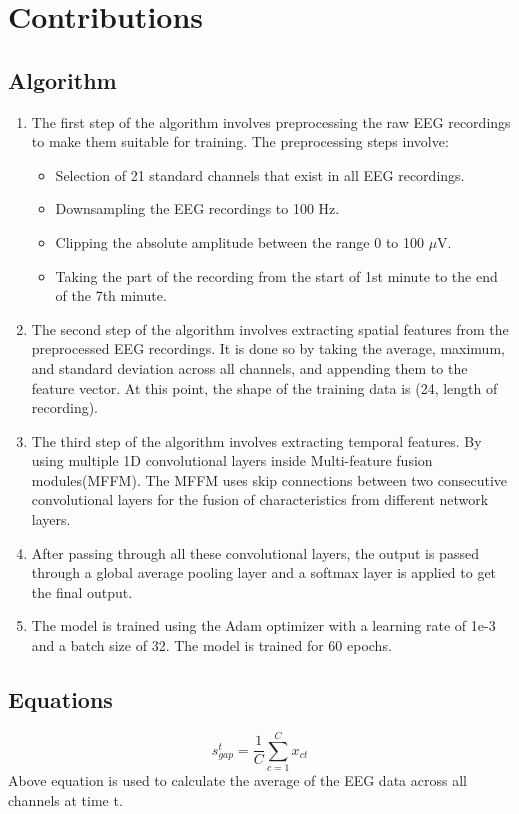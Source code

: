 \documentclass[10pt]{article}
\begin{document}
\section{Contributions} 
\subsection{Algorithm} 
\begin{enumerate}
  \item The first step of the algorithm involves preprocessing the raw EEG recordings to make them suitable for training. The preprocessing steps involve:
  \begin{itemize}
    \item Selection of 21 standard channels that exist in all EEG recordings.
    \item Downsampling the EEG recordings to 100 Hz.
    \item Clipping the absolute amplitude between the range 0 to 100 $\mu$V.
    \item Taking the part of the recording from the start of 1st minute to the end of the 7th minute.
  \end{itemize}
  \item The second step of the algorithm involves extracting spatial features from the preprocessed EEG recordings. It is done so by taking the average, maximum, and standard deviation across all channels, and appending them to the feature vector. At this point, the shape of the training data is (24, length of recording).
  \item The third step of the algorithm involves extracting temporal features. By using multiple 1D convolutional layers inside Multi-feature fusion modules(MFFM). The MFFM uses skip connections between two consecutive convolutional layers for the fusion of characteristics from different network layers.
  \item After passing through all these convolutional layers, the output is passed through a global average pooling layer and a softmax layer is applied to get the final output.
  \item The model is trained using the Adam optimizer with a learning rate of 1e-3 and a batch size of 32. The model is trained for 60 epochs.
\end{enumerate}

\subsection{Equations}
\[ s_{gap}^t = \frac{1}{C} \sum_{c=1}^{C} x_{ct} \]
Above equation is used to calculate the average of the EEG data across all channels at time t.
\end{document}
